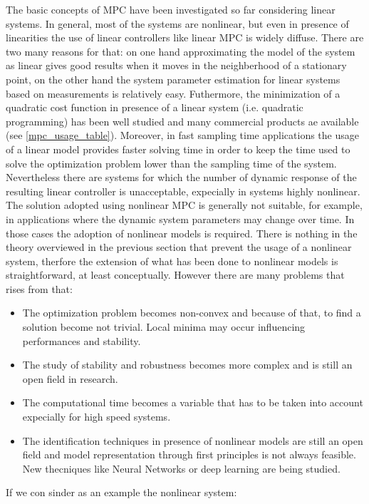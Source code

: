 The basic concepts of MPC have been investigated so far considering linear systems. In general, most of the systems are nonlinear, but even in presence of linearities the use of linear controllers like linear MPC is widely diffuse. There are two many reasons for that: on one hand approximating the model of the system as linear gives good results when it moves in the neighberhood of a stationary point, on the other hand the system parameter estimation for linear systems based on measurements is relatively easy. Futhermore, the minimization of a quadratic cost function in presence of a linear system (i.e. quadratic programming) has been well studied and many commercial products ae available (see \ref{mpc_usage_table}). Moreover, in fast sampling time applications the usage of a linear model provides faster solving time in order to keep the time used to solve the optimization problem lower than the sampling time of the system.
Nevertheless there are systems for which the number of dynamic response of the resulting linear controller is unacceptable, expecially in systems highly nonlinear. The solution adopted using nonlinear MPC is generally not suitable, for example, in applications where the dynamic system parameters may change over time. In those cases the adoption of nonlinear models is required. 
There is nothing in the theory overviewed in the previous section that prevent the usage of a nonlinear system, therfore the extension of what has been done to nonlinear models is straightforward, at least conceptually. However there are many problems that rises from that:

\begin{itemize}
\item The optimization problem becomes non-convex and because of that, to find a solution become not trivial. Local minima may occur influencing performances and stability.
\item The study of stability and robustness becomes more complex and is still an open field in research.
\item The computational time becomes a variable that has to be taken into account expecially for high speed systems.
\item The identification techniques in presence of nonlinear models are still an open field and model representation through first principles is not always feasible. New thecniques like Neural Networks or deep learning are being studied.
\end{itemize} 
If we con sinder as an example the nonlinear system:

